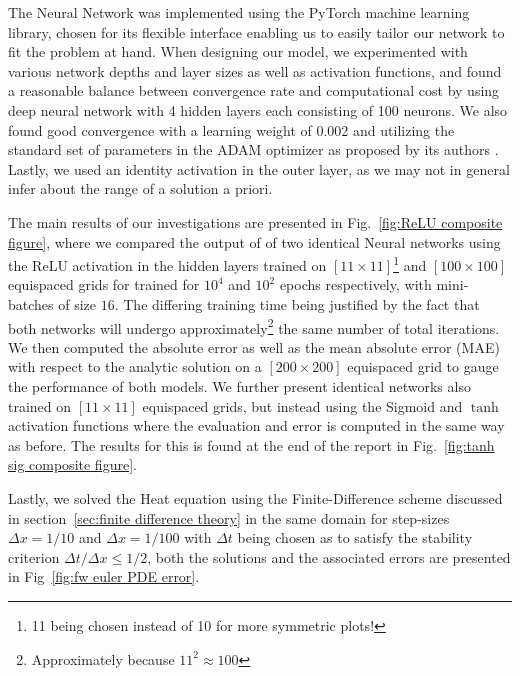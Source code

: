 \documentclass[reprint, english, nofootinbib]{revtex4-2}
\begin{document}
The Neural Network was implemented using the PyTorch \cite{NEURIPS2019_9015} machine learning library, chosen for its flexible interface enabling us to easily tailor our network to fit the problem at hand. When designing our model, we experimented with various network depths and layer sizes as well as activation functions, and found a reasonable balance between convergence rate and computational cost by using deep neural network with 4 hidden layers each consisting of 100 neurons. We also found good convergence with a learning weight of 0.002 and utilizing the standard set of parameters in the ADAM optimizer as proposed by its authors \textcite{kingma2017adam}. Lastly, we used an identity activation in the outer layer, as we may not in general infer about the range of a solution a priori. 

The main results of our investigations are presented in Fig.~\ref{fig:ReLU composite figure}, where we compared the output of of two identical Neural networks using the ReLU activation in the hidden layers trained on $[11\times11]$\footnote{11 being chosen instead of 10 for more symmetric plots!} and $[100\times100]$ equispaced grids for trained for $10^4$ and $10^2$ epochs respectively, with mini-batches of size $16$. The differing training time being justified by the fact that both networks will undergo approximately\footnote{Approximately because $11^2 \approx 100$} the same number of total iterations. We then computed the absolute error as well as the mean absolute error (MAE) with respect to the analytic solution on a $[200\times200]$ equispaced grid to gauge the performance of both models. We further present identical networks also trained on $[11\times11]$ equispaced grids, but instead using the Sigmoid and $\tanh$ activation functions where the evaluation and error is computed in the same way as before. The results for this is found at the end of the report in Fig.~\ref{fig:tanh sig composite figure}.

Lastly, we solved the Heat equation using the Finite-Difference scheme discussed in section~\ref{sec:finite difference theory} in the same domain for step-sizes $\Delta x = 1/10$ and $\Delta x = 1/100$ with $\Delta t$ being chosen as to satisfy the stability criterion $\Delta t / \Delta x \leq 1/2$, both the solutions and the associated errors are presented in Fig~\ref{fig:fw euler PDE error}.
\end{document}
